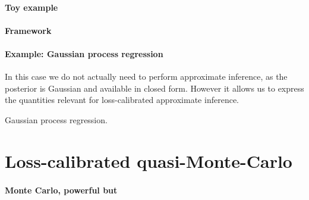 \paragraph{Toy example}

\paragraph{Framework}

\paragraph{Example: Gaussian process regression}

In this case we do not actually need to perform approximate inference, as the posterior is Gaussian and available in closed form. However it allows us to express the quantities relevant for loss-calibrated approximate inference.

Gaussian process regression.

\section{Loss-calibrated quasi-Monte-Carlo}

\paragraph{Monte Carlo, powerful but}


